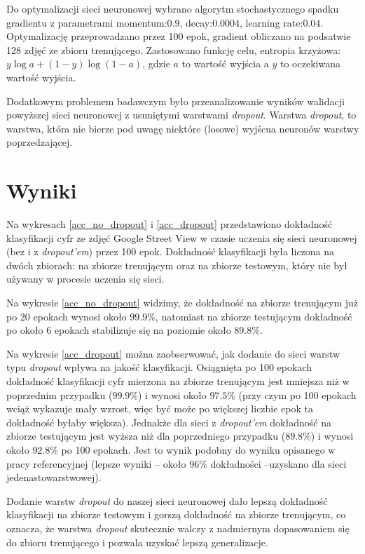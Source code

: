 \documentclass[12pt]{article}
\begin{document}
Do optymalizacji sieci neuronowej wybrano algorytm stochastycznego spadku gradientu z parametrami momentum:$0.9$, decay:$0.0004$, learning rate:$0.04$. Optymalizację przeprowadzano przez 100 epok, gradient obliczano na podsatwie 128 zdjęć ze zbioru trenującego. Zastosowano funkcję celu, entropia krzyżowa: $y\log a + (1-y)\log(1-a)$, gdzie $a$ to wartość wyjścia a $y$ to oczekiwana wartość wyjścia.

Dodatkowym problemem badawczym było przeanalizowanie wyników walidacji powyższej sieci neuronowej z usuniętymi warstwami \textit{dropout}. Warstwa \textit{dropout}, to warstwa, która nie bierze pod uwagę niektóre (losowe) wyjścua neuronów warstwy poprzedzającej.

\section{Wyniki}

Na wykresach \ref{acc_no_dropout} i \ref{acc_dropout} przedstawiono dokładność klasyfikacji cyfr ze zdjęć Google Street View w czasie uczenia się sieci neuronowej (bez i z \textit{dropout'em}) przez 100 epok. Dokładność klasyfikacji była liczona na dwóch zbiorach: na zbiorze trenującym oraz na zbiorze testowym, który nie był używany w procesie uczenia się sieci.

Na wykresie \ref{acc_no_dropout} widzimy, że dokładność na zbiorze trenującym już po 20 epokach wynosi około $99.9\%$, natomiast na zbiorze testującym dokładność po około 6 epokach stabilizuje się na poziomie około $89.8\%$.

Na wykresie \ref{acc_dropout} można zaobserwować, jak dodanie do sieci warstw typu \textit{dropout} wpływa na jakość klasyfikacji. Osiągnięta po 100 epokach dokładność klasyfikacji cyfr mierzona na zbiorze trenującym jest mniejsza niż w poprzednim przypadku ($99.9\%$) i wynosi około $97.5\%$ (przy czym po 100 epokach wciąż wykazuje mały wzrost, więc być może po większej liczbie epok ta dokładność byłaby większa). Jednakże dla sieci z \textit{dropout'em} dokładność na zbiorze testującym jest wyższa niż dla poprzedniego przypadku ($89.8\%$) i wynosi około $92.8\%$ po 100 epokach. Jest to wynik podobny do wyniku opisanego w pracy referencyjnej \cite{reference-paper} (lepsze wyniki -- około $96\%$ dokładności --uzyskano dla sieci jedenastowarstwowej).

Dodanie warstw \textit{dropout} do naszej sieci neuronowej dało lepszą dokładność klasyfikacji na zbiorze testowym i gorszą dokładność na zbiorze trenującym, co oznacza, że warstwa \textit{dropout} skutecznie walczy z nadmiernym dopasowaniem się do zbioru trenującego i pozwala uzyskać lepszą generalizacje.
\end{document}
